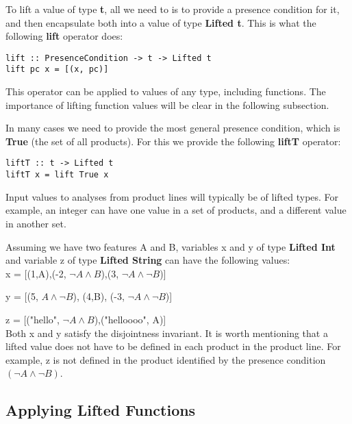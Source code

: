 \documentclass[11pt]{article} %
\begin{document}
To lift a value of type \textbf{t}, all we need to is to provide a presence condition for it, and then encapsulate both into a value of type \textbf{Lifted t}. This is what the following \textbf{lift} operator does:

\begin{verbatim}
lift :: PresenceCondition -> t -> Lifted t
lift pc x = [(x, pc)]
\end{verbatim}

This operator can be applied to values of any type, including functions. The importance of lifting function values will be clear in the following subsection.

In many cases we need to provide the most general presence condition, which is \textbf{True} (the set of all products). For this we provide the following \textbf{liftT} operator:

\begin{verbatim}
liftT :: t -> Lifted t
liftT x = lift True x
\end{verbatim}

Input values to analyses from product lines will typically be of lifted types. For example, an integer can have one value in a set of products, and a different value in another set. 

\begin{exmp}

Assuming we have two features A and B, variables x and y of type \textbf{Lifted Int} and variable z of type \textbf{Lifted String} can have the following values: \\

x = [(1,A),(-2, $\neg A \wedge B$),(3, $\neg A \wedge \neg B$)]

y = [(5, $A \wedge \neg B$), (4,B), (-3, $\neg A \wedge \neg B$)]

z = [("hello", $\neg A \wedge B$),("helloooo", A)] \\


Both x and y satisfy the disjointness invariant. It is worth mentioning that a lifted value does not have to be defined in each product in the product line. For example, z is not defined in the product identified by the presence condition $(\neg A \wedge \neg B)$.

\end{exmp}

\subsection{Applying Lifted Functions}
\end{document}
